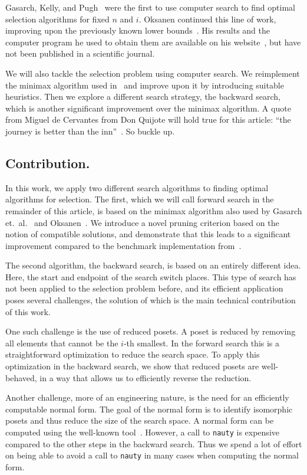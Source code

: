 \documentclass[a4paper,UKenglish,cleveref, autoref, thm-restate]{lipics-v2021}
\begin{document}
Gasarch, Kelly, and Pugh~\cite{Gasarch1996} were the first to use computer search to find optimal selection algorithms for fixed $n$ and $i$.
Oksanen continued this line of work, improving upon the previously known lower bounds~\cite{Oksanen2006}.
His results and the computer program he used to obtain them are available on his website~\cite{Oksanen}, but have not been published in a scientific journal.

We will also tackle the selection problem using computer search.
We reimplement the minimax algorithm used in~\cite{Gasarch1996,Oksanen,Oksanen2006} and improve upon it by introducing suitable heuristics.
Then we explore a different search strategy, the backward search, which is another significant improvement over the minimax algorithm.
A quote from Miguel de Cervantes from Don Quijote will hold true for this article: ``the journey is better than the inn''~\cite{cervantes_don_quijote}.
So buckle up.

\subsection{Contribution.}
In this work, we apply two different search algorithms to finding optimal algorithms for selection.
The first, which we will call forward search in the remainder of this article, is based on the minimax algorithm also used by Gasarch et.\ al\@.~\cite{Gasarch1996} and Oksanen~\cite{Oksanen,Oksanen2006}.
We introduce a novel pruning criterion based on the notion of compatible solutions, and demonstrate that this leads to a significant improvement compared to the benchmark implementation from~\cite{Oksanen}.

The second algorithm, the backward search, is based on an entirely different idea.
Here, the start and endpoint of the search switch places.
This type of search has not been applied to the selection problem before, and its efficient application poses several challenges, the solution of which is the main technical contribution of this work.

One such challenge is the use of reduced posets.
A poset is reduced by removing all elements that cannot be the $i$-th smallest.
In the forward search this is a straightforward optimization to reduce the search space.
To apply this optimization in the backward search, we show that reduced posets are well-behaved, in a way that allows us to efficiently reverse the reduction.

Another challenge, more of an engineering nature, is the need for an efficiently computable normal form.
The goal of the normal form is to identify isomorphic posets and thus reduce the size of the search space.
A normal form can be computed using the well-known  tool~\cite{MCKAY201494}.
However, a call to \texttt{nauty} is expensive compared to the other steps in the backward search.
Thus we spend a lot of effort on being able to avoid a call to \texttt{nauty} in many cases when computing the normal form.
\end{document}
